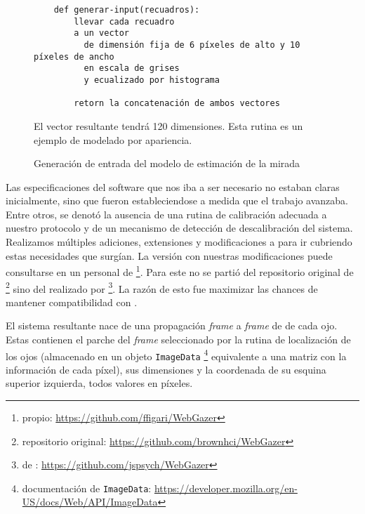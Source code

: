   \begin{figure}
    \begin{verbatim}
    def generar-input(recuadros):
        llevar cada recuadro
        a un vector
          de dimensión fija de 6 píxeles de alto y 10 píxeles de ancho
          en escala de grises
          y ecualizado por histograma

        retorn la concatenación de ambos vectores
    \end{verbatim}
    El vector resultante tendrá 120 dimensiones.
    Esta rutina es un ejemplo de modelado por apariencia.

    \caption{Generación de entrada del modelo de estimación de la mirada}
    \label{fig:eye-features-to-model-input}
  \end{figure}

  Las especificaciones del software que nos iba a ser necesario no estaban claras
  inicialmente, sino que fueron estableciendose a medida que el trabajo avanzaba.
  Entre otros, se denotó la ausencia de una rutina de calibración adecuada a
  nuestro protocolo y de un mecanismo de detección de descalibración del sistema.
  Realizamos múltiples adiciones, extensiones y modificaciones a \webgazer para
  ir cubriendo estas necesidades que surgían.
  La versión con nuestras modificaciones puede consultarse en un \fork
  personal de \webgazer \footnote{\fork propio:
  \url{https://github.com/ffigari/WebGazer}}.
  Para este \fork no se partió del repositorio original de \webgazer
  \footnote{repositorio original: \url{https://github.com/brownhci/WebGazer}}
  sino del \fork realizado por \jspsych \footnote{\fork de \jspsych:
  \url{https://github.com/jspsych/WebGazer}}.
  La razón de esto fue maximizar las chances de mantener compatibilidad con
  \jspsych.

  El sistema resultante nace de una propagación \textit{frame} a \textit{frame}
  de \features de cada ojo.
  Estas contienen el parche del \textit{frame} seleccionado por la rutina de
  localización de los ojos (almacenado en un objeto \texttt{ImageData}
  \footnote{documentación de \texttt{ImageData}:
  \url{https://developer.mozilla.org/en-US/docs/Web/API/ImageData}} equivalente a
  una matriz con la información de cada píxel), sus dimensiones y la coordenada
  de su esquina superior izquierda, todos valores en píxeles.

